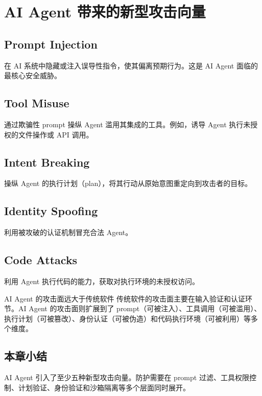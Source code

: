 \documentclass[a4paper]{article}
\begin{document}
\section{AI Agent 带来的新型攻击向量}

\subsection{Prompt Injection}

在 AI 系统中隐藏或注入误导性指令，使其偏离预期行为。这是 AI Agent 面临的最核心安全威胁。

\subsection{Tool Misuse}

通过欺骗性 prompt 操纵 Agent 滥用其集成的工具。例如，诱导 Agent 执行未授权的文件操作或 API 调用。

\subsection{Intent Breaking}

操纵 Agent 的执行计划（plan），将其行动从原始意图重定向到攻击者的目标。

\subsection{Identity Spoofing}

利用被攻破的认证机制冒充合法 Agent。

\subsection{Code Attacks}

利用 Agent 执行代码的能力，获取对执行环境的未授权访问。

\begin{warningbox}{AI Agent 的攻击面远大于传统软件}
传统软件的攻击面主要在输入验证和认证环节。AI Agent 的攻击面则扩展到了 prompt（可被注入）、工具调用（可被滥用）、执行计划（可被篡改）、身份认证（可被伪造）和代码执行环境（可被利用）等多个维度。
\end{warningbox}

\subsection{本章小结}

AI Agent 引入了至少五种新型攻击向量。防护需要在 prompt 过滤、工具权限控制、计划验证、身份验证和沙箱隔离等多个层面同时展开。
\end{document}
